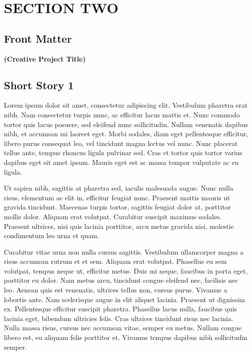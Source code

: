 \documentclass[a4paper]{memoir}
\begin{document}
\part{SECTION TWO}
\label{sectiontwo}

\chapter{Front Matter}
\label{frontmatter}

\textbf{(Creative Project Title)}

\chapter{Short Story 1}
\label{shortstory1}

Lorem ipsum dolor sit amet, consectetur adipiscing elit. Vestibulum pharetra erat nibh. Nam consectetur turpis nunc, ac efficitur lacus mattis et. Nunc commodo tortor quis lacus posuere, sed eleifend nunc sollicitudin. Nullam venenatis dapibus nibh, et accumsan mi laoreet eget. Morbi sodales, diam eget pellentesque efficitur, libero purus consequat leo, vel tincidunt magna lectus vel nunc. Nunc placerat tellus ante, tempus rhoncus ligula pulvinar sed. Cras et tortor quis tortor varius dapibus eget sit amet ipsum. Mauris eget est ac massa tempor vulputate ac eu ligula. 

Ut sapien nibh, sagittis at pharetra sed, iaculis malesuada augue. Nunc nulla risus, elementum ac elit in, efficitur feugiat nunc. Praesent mattis mauris ut gravida tincidunt. Maecenas turpis tortor, sagittis feugiat dolor at, porttitor mollis dolor. Aliquam erat volutpat. Curabitur suscipit maximus sodales. Praesent ultrices, nisi quis lacinia porttitor, arcu metus gravida nisi, molestie condimentum leo urna et quam. 

Curabitur vitae urna non nulla cursus sagittis. Vestibulum ullamcorper magna a risus accumsan rutrum et et sem. Aliquam erat volutpat. Phasellus eu sem volutpat, tempus neque ut, efficitur metus. Duis mi neque, faucibus in porta eget, porttitor eu dolor. Nam metus arcu, tincidunt congue eleifend nec, facilisis nec leo. Aenean quis est venenatis, ultrices tellus non, cursus purus. Vivamus a lobortis ante. Nam scelerisque augue in elit aliquet lacinia. Praesent ut dignissim ex. Pellentesque efficitur suscipit pharetra. Phasellus lacus nulla, faucibus quis lacinia eget, bibendum ultricies felis. Cras ultrices tincidunt risus nec lacinia. Nulla massa risus, cursus nec accumsan vitae, semper eu metus. Nullam congue libero est, eu aliquam felis porttitor et. Vivamus tempus dapibus nibh sollicitudin semper. 
\end{document}
